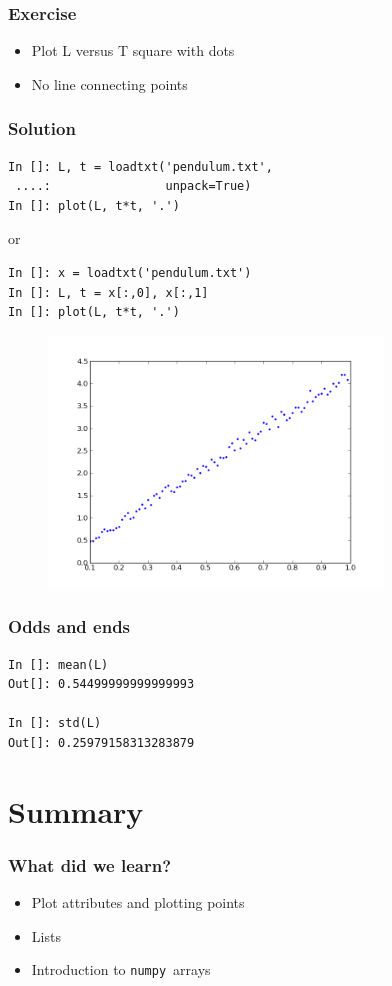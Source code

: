 \documentclass[14pt,compress]{beamer}
\newcounter{time}
\newcommand{\inctime}[1]{\addtocounter{time}{#1}{\tiny \thetime\ m}}
\newcommand{\num}{\texttt{numpy}}
\begin{document}
\begin{frame}[fragile]
  \frametitle{Exercise}
  \begin{itemize}
  \item Plot L versus T square with dots
  \item No line connecting points
  \end{itemize}
  \inctime{10}
\end{frame}

\begin{frame}[fragile]
\frametitle{Solution}
\begin{lstlisting}
In []: L, t = loadtxt('pendulum.txt',
 ....:                unpack=True)
In []: plot(L, t*t, '.')
\end{lstlisting}
or
\begin{lstlisting}
In []: x = loadtxt('pendulum.txt')
In []: L, t = x[:,0], x[:,1]
In []: plot(L, t*t, '.')
\end{lstlisting}

\end{frame}


\begin{frame}[fragile]
\begin{figure}
\includegraphics[width=3.5in]{data/L-Tsq.png}
\end{figure}
\end{frame}

\begin{frame}[fragile]
\frametitle{Odds and ends}
\begin{lstlisting}
In []: mean(L)
Out[]: 0.54499999999999993

In []: std(L)
Out[]: 0.25979158313283879
\end{lstlisting}
\end{frame}

\section {Summary}
\begin{frame}[fragile]
\frametitle{What did we learn?}
\begin{itemize}
  \item Plot attributes and plotting points
  \item Lists
  \item Introduction to \num\ arrays
\end{itemize}

\inctime{5}
\end{frame}
\end{document}
